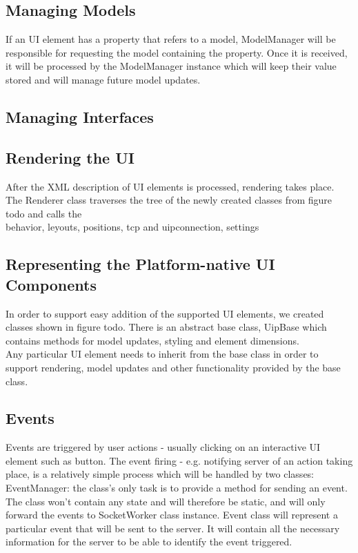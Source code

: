 \subsection{Managing Models}
If an UI element has a property that refers to a model, ModelManager will be responsible for requesting the model containing the property. Once it is received, it will be processed by the ModelManager instance which will keep their value stored and will manage future model updates.


\subsection{Managing Interfaces}

\subsection{Rendering the UI}
After the XML description of UI elements is processed, rendering takes place. The Renderer class traverses the tree of the newly created classes from figure todo and calls the 
\\behavior, leyouts, positions, tcp and uipconnection, settings

\subsection{Representing the Platform-native UI Components}
In order to support easy addition of the supported UI elements, we created classes shown in figure todo. There is an abstract base class, UipBase which contains methods for model updates, styling and element dimensions.\\
Any particular UI element needs to inherit from the base class in order to support rendering, model updates and other functionality provided by the base class.

\subsection{Events}
Events are triggered by user actions - usually clicking on an interactive UI element such as button. The event firing - e.g. notifying server of an action taking place, is a relatively simple process which will be handled by two classes: EventManager: the class's only task is to provide a method for sending an event. The class won't contain any state and will therefore be static, and will only forward the events to SocketWorker class instance. 
Event class will represent a particular event that will be sent to the server. It will contain all the necessary information for the server to be able to identify the event triggered.

